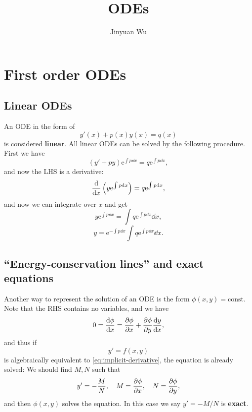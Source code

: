 \documentclass[hyperref, a4paper]{article}
\title{ODEs}
\author{Jinyuan Wu}
\newcommand*{\ee}{\mathrm{e}}
\newcommand*{\const}{\mathrm{const}}
\newcommand*{\concept}[1]{{\textbf{#1}}}
\begin{document}
\maketitle

\section{First order ODEs}

\subsection{Linear ODEs}

An ODE in the form of 
\begin{equation}
    y'(x) + p(x) y(x) = q(x) 
\end{equation}
is considered \concept{linear}.
All linear ODEs can be solved by the following procedure.
First we have 
\begin{equation}
    (y' + py) \ee^{\int p \dd{x}} 
    = q \ee^{\int p \dd{x}},
\end{equation}
and now the LHS is a derivative:
\begin{equation}
    \dv{x} \left(
        y \ee^{\int p \dd{x}}
    \right) = q \ee^{\int p \dd{x}},
\end{equation}
and now we can integrate over $x$ and get 
\begin{equation}
    y \ee^{\int p \dd{x}} = 
    \int q \ee^{\int p \dd{x}} \dd{x},
\end{equation}
\begin{equation}
    y  = \ee^{- \int p \dd{x}}
    \int q \ee^{\int p \dd{x}} \dd{x} .
\end{equation}

\subsection{``Energy-conservation lines'' and exact equations}

Another way to represent the solution of an ODE is 
the form $\phi(x, y) = \const$.
Note that the RHS contains no variables, and we have 
\begin{equation}
    0 = \dv{\phi}{x} = \pdv{\phi}{x} + \pdv{\phi}{y} \dv{y}{x},
    \label{eq:implicit-derivative}
\end{equation}
and thus if 
\begin{equation}
    y' = f(x, y)
\end{equation}
is algebraically equivalent to \eqref{eq:implicit-derivative},
the equation is already solved:
We should find $M, N$ such that 
\begin{equation}
    y' = - \frac{M}{N}, \quad
    M = \pdv{\phi}{x}, \quad
    N = \pdv{\phi}{y},
\end{equation}
and then $\phi(x, y)$ solves the equation.
In this case we say $y' = - M / N$ is \concept{exact}.
\end{document}
